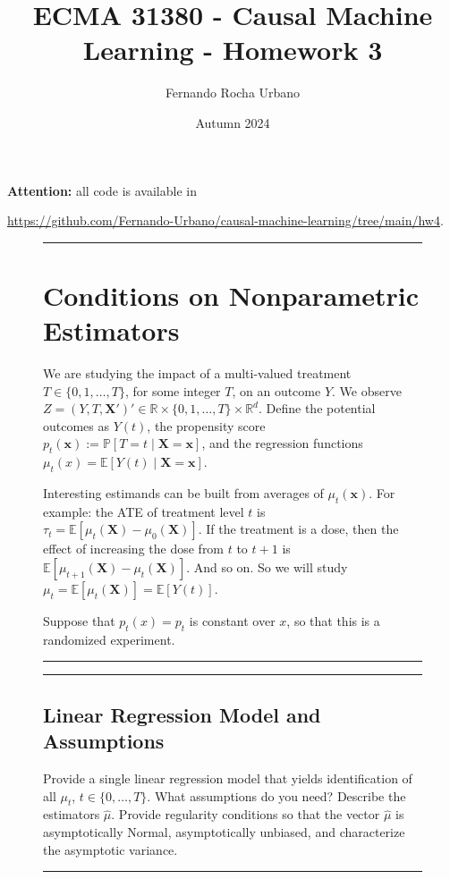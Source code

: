 \documentclass{article}
\title{ECMA 31380 - Causal Machine Learning - Homework 3}
\author{Fernando Rocha Urbano}
\date{Autumn 2024}
\newenvironment{colorparagraph}[1]{\par\color{#1}}{\par}
\begin{document}
\maketitle

\textbf{Attention:} all code is available in

\url{https://github.com/Fernando-Urbano/causal-machine-learning/tree/main/hw4}.

\begin{figure}[H]
  \begin{colorparagraph}{questioncolor}
  \rule{\textwidth}{0.5pt}
  \label{q1}
  \section{Conditions on Nonparametric Estimators}
  
  We are studying the impact of a multi-valued treatment \( T \in \{0, 1, \dots, T\} \), for some integer \( T \), on an outcome \( Y \). We observe \( Z = (Y, T, \mathbf{X}')' \in \mathbb{R} \times \{0, 1, \dots, T\} \times \mathbb{R}^d \). Define the potential outcomes as \( Y(t) \), the propensity score \( p_t(\mathbf{x}) := \mathbb{P}[T = t \mid \mathbf{X} = \mathbf{x}] \), and the regression functions \( \mu_t(x) = \mathbb{E}[Y(t) \mid \mathbf{X} = \mathbf{x}] \).
  
  Interesting estimands can be built from averages of \( \mu_t(\mathbf{x}) \). For example: the ATE of treatment level \( t \) is \( \tau_t = \mathbb{E}[\mu_t(\mathbf{X}) - \mu_0(\mathbf{X})] \). If the treatment is a dose, then the effect of increasing the dose from \( t \) to \( t+1 \) is \( \mathbb{E}[\mu_{t+1}(\mathbf{X}) - \mu_t(\mathbf{X})] \). And so on. So we will study \( \mu_t = \mathbb{E}[\mu_t(\mathbf{X})] = \mathbb{E}[Y(t)] \).
  
  Suppose that \( p_t(x) = p_t \) is constant over \( x \), so that this is a randomized experiment.
  
  \rule{\textwidth}{0.5pt}
  \end{colorparagraph}
\end{figure}
  
\begin{figure}[H]
  \begin{colorparagraph}{questioncolor}
  \rule{\textwidth}{0.5pt}
  \label{q1a}
  \subsection{Linear Regression Model and Assumptions}
  
  Provide a single linear regression model that yields identification of all \( \mu_t \), \( t \in \{0, \dots, T\} \). What assumptions do you need? Describe the estimators \( \hat{\mu} \). Provide regularity conditions so that the vector \( \hat{\mu} \) is asymptotically Normal, asymptotically unbiased, and characterize the asymptotic variance.
  
  \rule{\textwidth}{0.5pt}
  \end{colorparagraph}
\end{figure}
  
\end{document}
